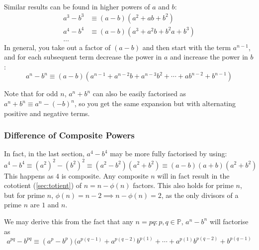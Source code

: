 \documentclass[fleqn,a4paper,11pt]{article}
\begin{document}
    Similar results can be found in higher powers of \(a\) and \(b\):
    \begin{align*}
    a^3 - b^3 &\equiv (a - b)(a^2 + ab + b^2) \\
    a^4 - b^4 &\equiv (a - b)(a^3 + a^2b + b^2a + b^3) \\
    \ldots
    \end{align*}
    In general, you take out a factor of \((a - b)\) and then start with the term
    \(a^{n - 1}\), and for each subsequent term decrease the power in \(a\) and
    increase the power in \(b\):
    \begin{equation}
    a^n - b^n \equiv (a - b)(a^{n - 1} + a^{n - 2}b + a^{n - 3}b^2 + \cdots +
                             ab^{n - 2} + b^{n - 1})
    \end{equation}

    Note that for odd \(n\), \(a^n + b^n\) can also be easily factorised as
    \(a^n + b^n \equiv a^n - (-b)^n\), so you get the same expansion but with
    alternating positive and negative terms.


    \subsubsection{Difference of Composite Powers}

    In fact, in the last section, \(a^4 - b^4\) may be more fully factorised by
    using:
    \begin{equation*}
    a^4 - b^4 \equiv (a^2)^2 - (b^2)^2 \equiv (a^2 - b^2)(a^2 + b^2) \equiv
        (a - b)(a + b)(a^2 + b^2)
    \end{equation*}
    This happens as \(4\) is composite. Any composite \(n\) will in fact result in
    the cototient (\ref{sec:totient}) of \(n = n - \phi(n)\) factors. This also
    holds for prime \(n\), but for prime
    \(n\), \(\phi(n) = n - 2 \implies n - \phi(n) = 2\), as the only divisors of
    a prime \(n\) are \(1\) and \(n\).

    We may derive this from the fact that any \(n = pq: p, q \in \mathbb{P}\),
    \(a^n - b^n\) will factorise as
    \begin{equation}
    a^{pq} - b^{pq} \equiv
     (a^p - b^p)(a^{p(q - 1)} + a^{p(q - 2)}b^{p(1)} + \cdots +
                 a^{p(1)}b^{p(q - 2)} + b^{p(q - 1)}
    \end{equation}
\end{document}
